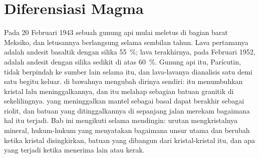 \chapter{Diferensiasi Magma}\label{ch:b2:magmatic-differentiation}

Pada 20 Februari 1943 sebuah gunung api mulai meletus di bagian barat Meksiko, dan letusannya berlangsung
selama sembilan tahun. Lava pertamanya adalah andesit basaltik dengan silika \qty{55}{\percent};
lava terakhirnya, pada Februari 1952, adalah andesit dengan silika sedikit di atas
\qty{60}{\percent}. Gunung api itu, Parícutin, tidak berpindah ke sumber lain selama
itu, dan lava-lavanya dianalisis satu demi satu begitu keluar. 
di bawahnya mengubah dirinya sendiri:  itu menumbuhkan kristal lalu meninggalkannya, dan  itu melahap
sebagian batuan granitik di sekelilingnya.  yang meninggalkan mantel sebagai basal dapat
berakhir sebagai riolit, dan batuan yang ditinggalkannya di sepanjang jalan merekam bagaimana hal itu terjadi.
Bab ini mengikuti  selama mendingin: urutan mengkristalnya mineral,
hukum-hukum yang menyatakan bagaimana unsur utama dan  berubah ketika kristal disingkirkan,
batuan yang dibangun dari kristal-kristal itu, dan apa yang terjadi ketika  menerima
 lain atau kerak.

